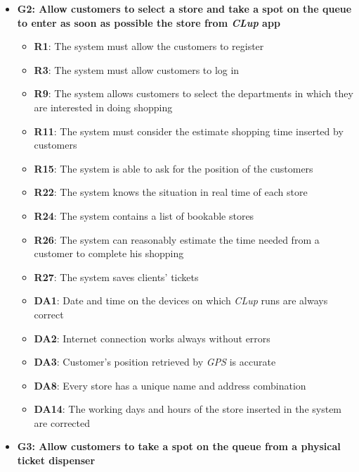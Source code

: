 \documentclass{article}
\begin{document}
\begin{itemize}
\begin{itemize}
					\end{itemize}
				
				\item {\bfseries G2: Allow customers to select a store and take a spot on the queue to enter as soon as possible the store from \emph{CLup} app}	

					\begin{itemize}
						
						\item {\bfseries R1}: The system must allow the customers to register
						\item {\bfseries R3}: The system must allow customers to log in
						\item {\bfseries R9}: The system allows customers to select the departments in which they are interested in doing shopping							\item {\bfseries R11}: The system must consider the estimate shopping time inserted by customers
						\item {\bfseries R15}: The system is able to ask for the position of the customers
						\item {\bfseries R22}: The system knows the situation in real time of each store
						\item {\bfseries R24}: The system contains a list of bookable stores
						\item {\bfseries R26}: The system can reasonably estimate the time needed from a customer to complete his shopping
						\item {\bfseries R27}: The system saves clients' tickets \\
		
						\item {\bfseries DA1}: Date and time on the devices on which \emph{CLup} runs are always correct
						\item {\bfseries DA2}: Internet connection works always without errors
						\item {\bfseries DA3}: Customer’s position retrieved by \emph{GPS} is accurate
						\item {\bfseries DA8}: Every store has a unique name and address combination
						\item {\bfseries DA14}: The working days and hours of the store inserted in the system are corrected
						
					\end{itemize}

				\item {\bfseries G3: Allow customers to take a spot on the queue from a physical ticket dispenser}	


\end{itemize}
\end{document}
